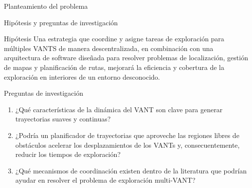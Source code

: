 \documentclass[24pt,aspectratio=169]{beamer}
\begin{document}
\begin{frame}[fragile]{Planteamiento del problema}
\end{frame}

\begin{frame}{Hipótesis y preguntas de investigación}
  
  \begin{block}{Hipótesis}
    \vspace{1mm}
    \small Una estrategia que coordine y asigne tareas de exploración para múltiples VANTS de manera descentralizada, en combinación con una arquitectura de software diseñada para resolver problemas de localización, gestión de mapas y planificación de rutas, mejorará la eficiencia y cobertura de la exploración en interiores de un entorno desconocido.
  \end{block}
  \begin{block}{Preguntas de investigación}
    \small{
      \begin{enumerate}
      \item ¿Qué características de la dinámica del VANT son clave para generar trayectorias suaves y continuas?
      \item ¿Podría un planificador de trayectorias que aproveche las regiones libres de obstáculos acelerar los desplazamientos de los VANTs y, consecuentemente, reducir los tiempos de exploración?
      \item ¿Qué mecanismos de coordinación existen dentro de la literatura que podrían ayudar en resolver el problema de exploración multi-VANT?
      \end{enumerate}
    }
  \end{block}
\end{frame}
\end{document}
